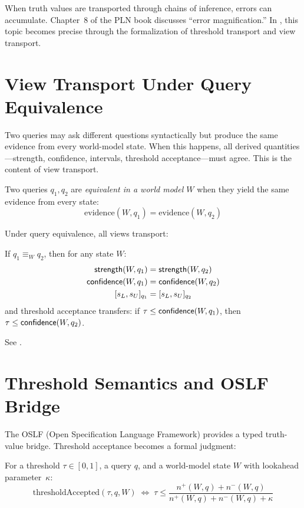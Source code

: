 \documentclass[11pt,openany]{report}
\begin{document}
When truth values are transported through chains of inference, errors can
accumulate.  Chapter~8 of the PLN book discusses ``error magnification.''
In \xiPLN{}, this topic becomes precise through the formalization of
threshold transport and view transport.

\section{View Transport Under Query Equivalence}

Two queries may ask different questions syntactically but produce the
same evidence from every world-model state.  When this happens, all
derived quantities---strength, confidence, intervals, threshold
acceptance---must agree.  This is the content of view transport.

\begin{definition}
Two queries $q_1, q_2$ are \emph{equivalent in a world model $W$} when
they yield the same evidence from every state:
\[
  \mathrm{evidence}(W, q_1) = \mathrm{evidence}(W, q_2)
\]
\end{definition}

Under query equivalence, all views transport:

\begin{theorem}
If $q_1 \equiv_W q_2$, then for any state $W$:
\begin{align}
  \mathsf{strength}(W, q_1) &= \mathsf{strength}(W, q_2) \\
  \mathsf{confidence}(W, q_1) &= \mathsf{confidence}(W, q_2) \\
  [s_L, s_U]_{q_1} &= [s_L, s_U]_{q_2}
\end{align}
and threshold acceptance transfers: if $\tau \le \mathsf{confidence}(W, q_1)$,
then $\tau \le \mathsf{confidence}(W, q_2)$.
\end{theorem}

See .

\section{Threshold Semantics and OSLF Bridge}

The OSLF (Open Specification Language Framework) provides a typed
truth-value bridge.  Threshold acceptance becomes a formal judgment:

\begin{definition}
For a threshold $\tau \in [0,1]$, a query $q$, and a world-model state $W$
with lookahead parameter~$\kappa$:
\[
  \mathrm{thresholdAccepted}(\tau, q, W) \;\iff\;
  \tau \le \frac{n^+(W, q) + n^-(W, q)}{n^+(W, q) + n^-(W, q) + \kappa}
\]
\end{definition}
\end{document}
